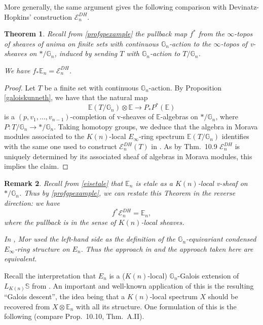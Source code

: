 \documentclass[12pt]{article}
\newtheorem{theorem}{Theorem}[section]
\newtheorem{remark}[theorem]{Remark}
\newcommand{\mbb}{\mathbb}
\begin{document}
More generally, the same argument gives the following comparison with Devinatz-Hopkins' construction $\mathcal{E}_n^{DH}$.

\begin{theorem}
Recall from \ref{profgpexample} the pullback map $f^\ast$ from the $\infty$-topos of sheaves of anima on finite sets with continuous $\mathbb{G}_n$-action to the $\infty$-topos of v-sheaves on $\ast/\mathbb{G}_n$, induced by sending $T$ with $\mathbb{G}_n$-action to $T/\mathbb{G}_n$.

We have $f_\ast \mathbb{E}_n = \mathcal{E}_n^{DH}$.
\end{theorem}
\begin{proof}
Let $T$ be a finite set with continuous $\mathbb{G}_n$-action.  By Proposition \ref{galoiskunneth}, we have that the natural map
$$\mathbb{E}(T/\mathbb{G}_n)\otimes \mathbb{E} \to P_\ast P^\ast (\mathbb{E})$$
is a $(p,v_1,\ldots,v_{n-1})$-completion of v-sheaves of $\mathbb{E}$-algebras on $\ast/\mathbb{G}_n$, where $P:T/\mathbb{G}_n\to \ast/\mathbb{G}_n$.  Taking homotopy groups, we deduce that the algebra in Morava modules associated to the $K(n)$-local $E_\infty$-ring spectrum $\mathbb{E}(T/\mathbb{G}_n)$ identifies with the same one used to construct $\mathcal{E}_n^{DH}(T)$ in \cite{DevinatzE}.  As by \cite{MathewGalois} Thm.\ 10.9 $\mathcal{E}_n^{DH}$ is uniquely determined by its associated sheaf of algebras in Morava modules, this implies the claim.
\end{proof}

\begin{remark}
Recall from \ref{eisetale} that $\mathbb{E}_n$ is etale as a $K(n)$-local v-sheaf on $\ast/\mathbb{G}_n$.  Thus by \ref{profgpexample}, we can restate this Theorem in the reverse direction: we have
$$f^\ast \mathcal{E}_n^{DH} = \mathbb{E}_n,$$
where the pullback is in the sense of $K(n)$-local sheaves.

In \cite{MorPicard}, Mor used the left-hand side as the definition of the $\mathbb{G}_n$-equivariant condensed $E_\infty$-ring structure on $E_n$.  Thus the approach in \cite{MorPicard} and the approach taken here are equivalent.
\end{remark}

Recall the interpretation that $E_n$ is a ($K(n)$-local)  $\mbb{G}_n$-Galois extension of $L_{K(n)}\mbb{S}$ from \cite{RognesGalois}.  An important and well-known application of this is the resulting ``Galois descent'', the idea being that a $K(n)$-local spectrum $X$ should be recovered from $X\otimes \mathbb{E}_n$ with all its structure.  One formulation of this is the following (compare \cite{MathewGalois} Prop.\ 10.10, \cite{MorPicard} Thm.\ A.II).
\end{document}
